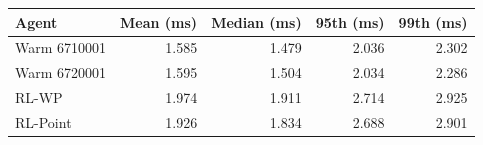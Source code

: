 \begin{tabular}{lrrrr}
\toprule
Agent & Mean (ms) & Median (ms) & 95th (ms) & 99th (ms) \\
\midrule
Warm 6710001 & 1.585 & 1.479 & 2.036 & 2.302 \\
Warm 6720001 & 1.595 & 1.504 & 2.034 & 2.286 \\
RL-WP & 1.974 & 1.911 & 2.714 & 2.925 \\
RL-Point & 1.926 & 1.834 & 2.688 & 2.901 \\
\bottomrule
\end{tabular}
